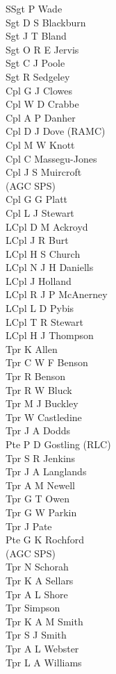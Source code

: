 \documentclass[a4paper,7pt]{book}
\begin{document}
\begin{multicols}{3}
\small
\noindent
  SSgt P Wade \\
  Sgt D S Blackburn \\
  Sgt J T Bland \\
  Sgt O R E Jervis \\
  Sgt C J Poole \\
  Sgt R Sedgeley \\
  Cpl G J Clowes \\
  Cpl W D Crabbe \\
  Cpl A P Danher \\
  Cpl D J Dove (RAMC) \\
  Cpl M W Knott \\
  Cpl C Massegu-Jones \\
  Cpl J S Muircroft \\ \indent (AGC SPS) \\
  Cpl G G Platt \\
  Cpl L J Stewart \\
  LCpl D M Ackroyd \\
  LCpl J R Burt \\
  LCpl H S Church \\
  LCpl N J H Daniells \\
  LCpl J Holland \\
  LCpl R J P McAnerney \\
  LCpl L D Pybis \\
  LCpl T R Stewart \\
  LCpl H J Thompson \\
  Tpr K Allen \\
  Tpr C W F Benson \\
  Tpr R Benson \\
  Tpr R W Bluck \\
  Tpr M J Buckley \\
  Tpr W Castledine \\
  Tpr J A Dodds \\
  Pte P D Gostling (RLC) \\
  Tpr S R Jenkins \\
  Tpr J A Langlands \\
  Tpr A M Newell \\
  Tpr G T Owen \\
  Tpr G W Parkin \\
  Tpr J Pate \\
  Pte G K Rochford \\ \indent (AGC SPS) \\
  Tpr N Schorah \\
  Tpr K A Sellars \\
  Tpr A L Shore \\
  Tpr Simpson \\
  Tpr K A M Smith \\
  Tpr S J Smith \\
  Tpr A L Webster \\
  Tpr L A Williams
\end{multicols}

\pagebreak
\end{document}
